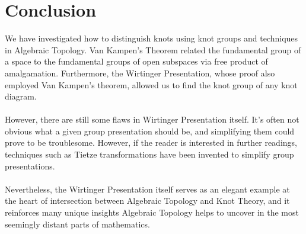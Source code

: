 \documentclass{article}
\begin{document}
\newpage
\section{Conclusion}
We have investigated how to distinguish knots using knot groups and techniques in Algebraic Topology. Van Kampen's Theorem related the fundamental group of a space to the fundamental groups of open subspaces via free product of amalgamation. Furthermore, the Wirtinger Presentation, whose proof also employed Van Kampen's theorem, allowed us to find the knot group of any knot diagram.\\\\
However, there are still some flaws in Wirtinger Presentation itself. It's often not obvious what a given group presentation should be, and simplifying them could prove to be troublesome. However, if the reader is interested in further readings, techniques such as Tietze transformations have been invented to simplify group presentations.\\\\
Nevertheless, the Wirtinger Presentation itself serves as an elegant example at the heart of intersection between Algebraic Topology and Knot Theory, and it reinforces many unique insights Algebraic Topology helps to uncover in the most seemingly distant parts of mathematics.





 
\end{document}
